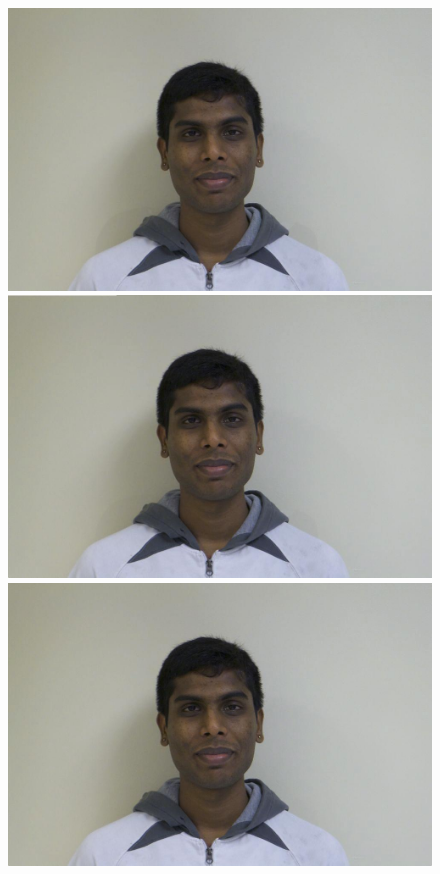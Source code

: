 \documentclass[11pt]{article}
\begin{document}
\begin{figure}[H]
\begin{center}
\includegraphics[scale=0.06]{figs/frames/morph_steinkirch_tangatur_58.jpg} 
\includegraphics[scale=0.06]{figs/frames/morph_steinkirch_tangatur_59.jpg} 
\includegraphics[scale=0.06]{figs/frames/morph_steinkirch_tangatur_60.jpg} 

\end{center}
\end{figure}
\end{document}
